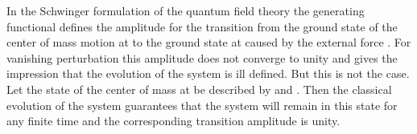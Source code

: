 \documentclass[a4paper,12pt] {article}
\begin{document}
In the Schwinger formulation of the quantum field theory \cite{SW70}
the generating functional \coordHE{} defines the
amplitude for the transition from the ground state of the center of
mass motion at \coordHE{} to the ground state at \coordHE{}
caused by the external force \coordHE{}. For vanishing perturbation
this amplitude does not converge to unity and gives the impression
that the evolution of the system is ill defined. But this is not the
case. Let the state of the center of mass at \coordHE{} be described by
\coordHE{} and \coordHE{}. Then the classical
evolution of the system guarantees that the system will remain in this
state for any finite time and the corresponding transition amplitude
is unity.
\end{document}
